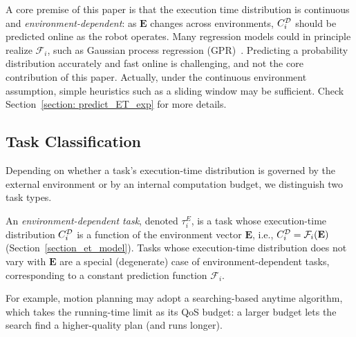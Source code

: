 A core premise of this paper is that the execution time distribution is continuous and \emph{environment-dependent}: as $\textbf{E}$ changes across environments, $C_{i}^{\mathcal{D}}$ should be predicted online as the robot operates.
Many regression models could in principle realize $\mathcal{F}_i$, such as Gaussian process regression (GPR)~\cite{Rasmussen2005GaussianPF}.
Predicting a probability distribution accurately and fast online is challenging, and not the core contribution of this paper. 
Actually, under the continuous environment assumption, simple heuristics such as a sliding window may be sufficient. Check Section~\ref{section: predict_ET_exp} for more details.



	\subsection{Task Classification}
	\label{section_task_classification}

    Depending on whether a task's execution-time distribution is governed by the external environment or by an internal computation budget, we distinguish two task types.

	\begin{definition}
		\label{def_env_task}
		An \emph{environment-dependent task}, denoted $\tau^E_i$, is a task whose execution-time distribution $C_{i}^{\mathcal{D}}$ is a function of the environment vector $\textbf{E}$,
		i.e., $C_{i}^{\mathcal{D}} = \mathcal{F}_i(\textbf{E})$ (Section~\ref{section_et_model}).
		Tasks whose execution-time distribution does not vary with $\textbf{E}$ are a special (degenerate) case of environment-dependent tasks,
		corresponding to a constant prediction function $\mathcal{F}_i$.
	\end{definition}

	For example, motion planning may adopt a searching-based anytime algorithm, which takes the running-time limit as its QoS budget: a larger budget lets the search find a higher-quality plan (and runs longer).

